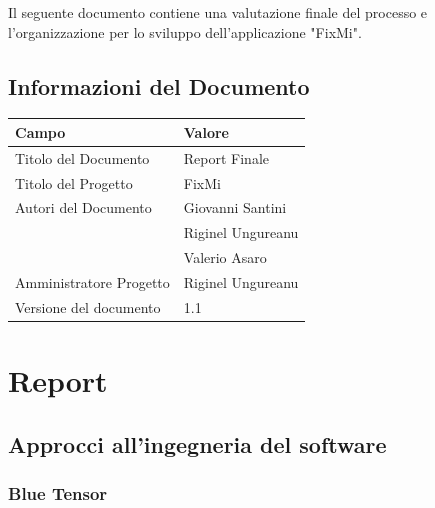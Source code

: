 \documentclass{report}
\begin{document}
	Il seguente documento contiene una valutazione finale del processo e l'organizzazione per lo sviluppo dell'applicazione "FixMi".
	
	\section{Informazioni del Documento}
	
	\begin{center} %
		\centering
		\begin{tabular}{ |p{4cm}|p{4cm}|  }
			\hline
			\centering Campo & \qquad\qquad Valore \\ %
			\hline
			Titolo del Documento & Report Finale \\
			\hline
			Titolo del Progetto & FixMi \\
			\hline
			Autori del Documento &
			Giovanni Santini \\ & Riginel Ungureanu \\ & Valerio Asaro \\
			\hline
			Amministratore Progetto & Riginel Ungureanu\\
			\hline
			Versione del documento & 1.1 \\
			\hline
		\end{tabular}
	\end{center}
	
	
	
\chapter{Report}

\section{Approcci all'ingegneria del software}

\subsection{Blue Tensor}
\end{document}
